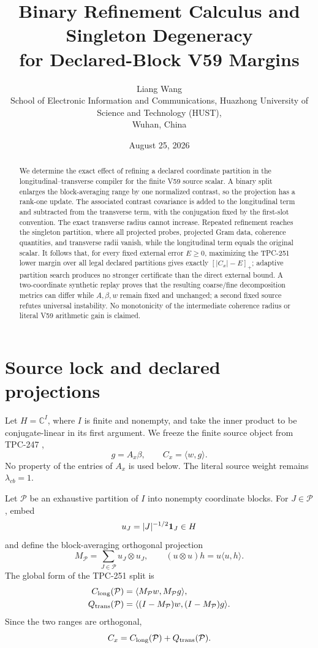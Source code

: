 \documentclass[10pt]{article}
\title{Binary Refinement Calculus and Singleton Degeneracy\\
for Declared-Block V59 Margins}
\author{Liang Wang\\
\small School of Electronic Information and Communications, Huazhong University of Science and Technology (HUST),\\
\small Wuhan, China}
\date{August 25, 2026}
\newcommand{\C}{\mathbb{C}}
\newcommand{\ip}[2]{\langle #1,#2\rangle}
\newcommand{\M}{M_{\mathcal P}}
\begin{document}
\maketitle

\begin{abstract}
We determine the exact effect of refining a declared coordinate partition in
the longitudinal--transverse compiler for the finite V59 source scalar.  A
binary split enlarges the block-averaging range by one normalized contrast,
so the projection has a rank-one update.  The associated contrast covariance
is added to the longitudinal term and subtracted from the transverse term,
with the conjugation fixed by the first-slot convention.  The exact
transverse radius cannot increase.  Repeated refinement reaches the singleton
partition, where all projected probes, projected Gram data, coherence
quantities, and transverse radii vanish, while the longitudinal term equals
the original scalar.  It follows that, for every fixed external error
$E\geq0$, maximizing the TPC-251 lower margin over all legal declared
partitions gives exactly $[|C_x|-E]_+$; adaptive partition search produces no
stronger certificate than the direct external bound.  A two-coordinate
synthetic replay proves that the resulting coarse/fine decomposition metrics
can differ while $A,\beta,w$ remain fixed and unchanged; a second fixed source
refutes universal instability.
No monotonicity of the intermediate coherence radius or literal V59
arithmetic gain is claimed.
\end{abstract}

\section{Source lock and declared projections}

Let $H=\C^I$, where $I$ is finite and nonempty, and take the inner product to
be conjugate-linear in its first argument.  We freeze the finite source object
from TPC-247 \cite{tpc247},
\begin{equation}\label{eq:source}
 g=A_x\beta,\qquad C_x=\ip{w}{g}.
\end{equation}
No property of the entries of $A_x$ is used below.  The literal source weight
remains $\lambda_{cb}=1$.

Let $\mathcal P$ be an exhaustive partition of $I$ into nonempty coordinate
blocks.  For $J\in\mathcal P$, embed
\[
 u_J=|J|^{-1/2}{\bf1}_J\in H
\]
and define the block-averaging orthogonal projection
\begin{equation}\label{eq:projection}
 M_{\mathcal P}=\sum_{J\in\mathcal P}u_J\otimes u_J,
 \qquad (u\otimes u)h=u\ip{u}{h}.
\end{equation}
The global form of the TPC-251 split \cite{tpc251} is
\begin{align}
 C_{\rm long}(\mathcal P)&=\ip{\M w}{\M g},\label{eq:long}\\
 Q_{\rm trans}(\mathcal P)&=\ip{(I-\M)w}{(I-\M)g}.
 \label{eq:qtrans}
\end{align}
Since the two ranges are orthogonal,
\begin{equation}\label{eq:split}
 C_x=C_{\rm long}(\mathcal P)+Q_{\rm trans}(\mathcal P).
\end{equation}
\end{document}
